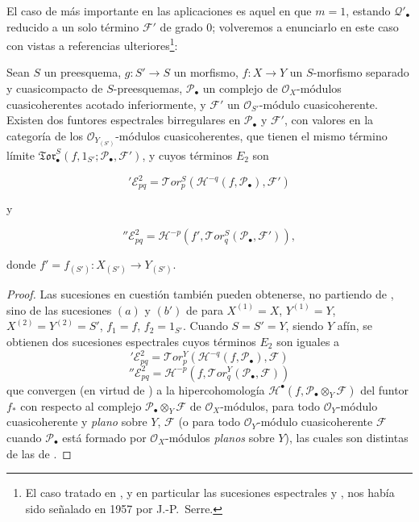El caso de  más importante en las aplicaciones es aquel en
que $m=1$, estando $\mathscr Q'_\bullet$ reducido a un solo término
$\mathscr F'$ de grado $0$; volveremos a enunciarlo en este caso con vistas
a referencias ulteriores\footnote{El caso tratado en , y en
particular las sucesiones espectrales  y
, nos había sido señalado en 1957 por J.-P.~Serre.}:

\begin{proposition}[6.9.8]
\label{III.6.9.8}
Sean $S$ un preesquema, $g:S'\to S$ un morfismo,
$f:X\to Y$ un $S$-morfismo separado y cuasicompacto de $S$-preesquemas,
$\mathscr P_\bullet$ un complejo de $\mathscr O_X$-módulos cuasicoherentes
acotado inferiormente, y $\mathscr F'$ un $\mathscr O_{S'}$-módulo
cuasicoherente. Existen dos funtores espectrales birregulares en
$\mathscr P_\bullet$ y $\mathscr F'$, con valores en la categoría de los
$\mathscr O_{Y_{(S')}}$-módulos cuasicoherentes, que tienen el mismo término
límite $\mathfrak{Tor}_\bullet^S(f,1_{S'};\mathscr P_\bullet,\mathscr F')$, y cuyos términos $E_2$ son

\label{III.6.9.8.1}
\[
  {}'\mathscr E_{pq}^2
  =\mathscr{T}\!or_p^S
  (\mathscr H^{-q}(f,\mathscr P_\bullet),\mathscr F')
  \tag{6.9.8.1}\label{III.6.9.8.1.fr}
\]

y

\label{III.6.9.8.2}
\[
  {}''\mathscr E_{pq}^2
  =\mathscr H^{-p}
  (f',\mathscr{T}\!or_q^S(\mathscr P_\bullet,\mathscr F')),
  \tag{6.9.8.2}\label{III.6.9.8.2.fr}
\]

donde $f'=f_{(S')}:X_{(S')}\to Y_{(S')}$.
\end{proposition}

\begin{proof}
Las sucesiones en cuestión también pueden obtenerse, no partiendo de
, sino de las sucesiones $(a)$ y $(b')$ de
 para $X^{(1)}=X$, $Y^{(1)}=Y$,
$X^{(2)}=Y^{(2)}=S'$, $f_1=f$, $f_2=1_{S'}$. Cuando $S=S'=Y$, siendo $Y$
afín, se obtienen dos sucesiones espectrales cuyos términos $E_2$ son iguales
a
\[
  {}'\mathscr E_{pq}^2
  =\mathscr{T}\!or_p^Y
  (\mathscr H^{-q}(f,\mathscr P_\bullet),\mathscr F)
  \tag{6.9.8.3}\label{III.6.9.8.3.fr}
\]
\[
  {}''\mathscr E_{pq}^2
  =\mathscr H^{-p}
  (f,\mathscr{T}\!or_q^Y(\mathscr P_\bullet,\mathscr F))
  \tag{6.9.8.4}\label{III.6.9.8.4.fr}
\]
que convergen (en virtud de ) a la hipercohomología
$\mathscr H^\bullet(f,\mathscr P_\bullet\otimes_Y\mathscr F)$ del funtor
$f_*$ con respecto al complejo
$\mathscr P_\bullet\otimes_Y\mathscr F$ de $\mathscr O_X$-módulos, para todo
$\mathscr O_Y$-módulo cuasicoherente y \emph{plano} sobre $Y$, $\mathscr F$ (o para
todo $\mathscr O_Y$-módulo cuasicoherente $\mathscr F$ cuando
$\mathscr P_\bullet$ está formado por $\mathscr O_X$-módulos \emph{planos} sobre
$Y$), las cuales son distintas de las de .
\end{proof}

